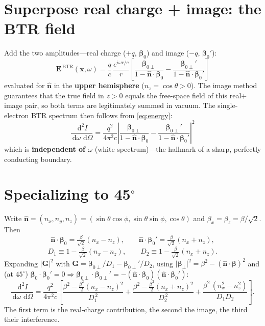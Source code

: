 \documentclass[11pt]{article}
\newcommand{\nhat}{\hat{\bm{n}}}
\newcommand{\bbeta}{\bm{\beta}}
\newcommand{\bE}{\bm{E}}
\newcommand{\dd}{\,\mathrm{d}}
\begin{document}
\section{Superpose real charge + image: the BTR field}

Add the two amplitudes---real charge ($+q$, $\bbeta_0$) and image ($-q$,
$\bbeta_0'$):
\begin{equation}
\boxed{\;
\bE^{\,\mathrm{BTR}}(\bm{x},\omega)=\frac{q}{c}\,\frac{e^{i\omega r/c}}{r}
\left[\frac{\bbeta_{0\perp}}{1-\nhat\cdot\bbeta_0}
-\frac{\bbeta_{0\perp}'}{1-\nhat\cdot\bbeta_0'}\right]
\;}
\label{eq:btrfield}
\end{equation}
evaluated for $\nhat$ in the \textbf{upper hemisphere} ($n_z=\cos\theta>0$).
The image method guarantees that the true field in $z>0$ equals the free-space
field of this real$+$image pair, so both terms are legitimately summed in
vacuum. The single-electron BTR spectrum then follows from
\eqref{eq:energy}:
\begin{equation}
\boxed{\;
\frac{\dd^2 I}{\dd\omega\,\dd\Omega}=\frac{q^2}{4\pi^2 c}
\left|\frac{\bbeta_{0\perp}}{1-\nhat\cdot\bbeta_0}
-\frac{\bbeta_{0\perp}'}{1-\nhat\cdot\bbeta_0'}\right|^2
\;}
\label{eq:btrspec}
\end{equation}
which is \textbf{independent of $\omega$} (white spectrum)---the hallmark of a
sharp, perfectly conducting boundary.

\section{Specializing to 45$^\circ$}

Write $\nhat=(n_x,n_y,n_z)=(\sin\theta\cos\phi,\sin\theta\sin\phi,\cos\theta)$
and $\beta_x=\beta_z=\beta/\sqrt2$. Then
\begin{equation}
\nhat\cdot\bbeta_0=\tfrac{\beta}{\sqrt2}(n_x-n_z),\qquad
\nhat\cdot\bbeta_0'=\tfrac{\beta}{\sqrt2}(n_x+n_z),
\end{equation}
\begin{equation}
D_1\equiv1-\tfrac{\beta}{\sqrt2}(n_x-n_z),\qquad
D_2\equiv1-\tfrac{\beta}{\sqrt2}(n_x+n_z).
\end{equation}
Expanding $\lvert\bm{G}\rvert^2$ with
$\bm{G}=\bbeta_{0\perp}/D_1-\bbeta_{0\perp}'/D_2$, using
$\lvert\bbeta_\perp\rvert^2=\beta^2-(\nhat\cdot\bbeta)^2$ and (at $45^\circ$)
$\bbeta_0\cdot\bbeta_0'=0\Rightarrow
\bbeta_{0\perp}\cdot\bbeta_{0\perp}'=-(\nhat\cdot\bbeta_0)(\nhat\cdot\bbeta_0')$:
\begin{equation}
\frac{\dd^2 I}{\dd\omega\,\dd\Omega}=\frac{q^2}{4\pi^2 c}
\left[
\frac{\beta^2-\tfrac{\beta^2}{2}(n_x-n_z)^2}{D_1^{\,2}}
+\frac{\beta^2-\tfrac{\beta^2}{2}(n_x+n_z)^2}{D_2^{\,2}}
+\frac{\beta^2\,(n_x^2-n_z^2)}{D_1 D_2}
\right].
\label{eq:full45}
\end{equation}
The first term is the real-charge contribution, the second the image, the
third their interference.
\end{document}
